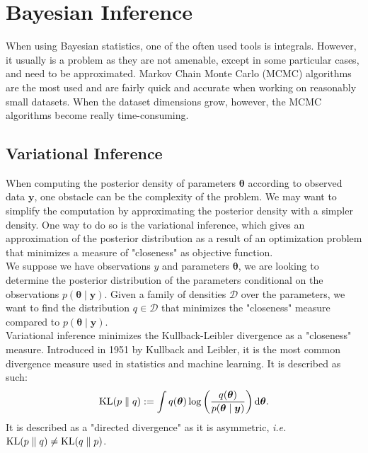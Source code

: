 \documentclass{article}
\DeclareMathOperator*{\KL}{{\rm KL}}
\begin{document}
\section{Bayesian Inference}
When using Bayesian statistics, one of the often used tools is integrals. However, it usually is a problem as they are not amenable, except in some particular cases, and need to be approximated. Markov Chain Monte Carlo (MCMC) algorithms are the most used and are fairly quick and accurate when working on reasonably small datasets. When the dataset dimensions grow, however, the MCMC algorithms become really time-consuming.
\subsection{Variational Inference}
When computing the posterior density of parameters $\boldsymbol{\theta}$ according to observed data $\boldsymbol{y}$, one obstacle can be the complexity of the problem. We may want to simplify the computation by approximating the posterior density with a simpler density. One way to do so is the variational inference, which gives an approximation of the posterior distribution as a result of an optimization problem that minimizes a measure of "closeness" as objective function.\\
\newline
%
We suppose we have observations $y$ and parameters $\boldsymbol{\theta}$, we are looking to determine the posterior distribution of the parameters conditional on the observations $p(\boldsymbol{\theta} \mid \boldsymbol{y})$. Given a family of densities $\mathcal{D}$ over the parameters, we want to find the distribution $q \in \mathcal{D}$ that minimizes the "closeness" measure compared to $p(\boldsymbol{\theta} \mid \boldsymbol{y})$.\\
\newline
%
Variational inference minimizes the Kullback-Leibler divergence as a "closeness" measure. Introduced in 1951 by Kullback and Leibler\cite{kl51}, it is the most common divergence measure used in statistics and machine learning. It is described as such:
\begin{equation*}
\KL(p\parallel q) := \int q(\boldsymbol{\theta})\log \left(\frac{q(\boldsymbol{\theta})}{p(\boldsymbol{\theta} \mid \boldsymbol{y})}\right) \mathrm{d}\boldsymbol{\theta}.
\end{equation*} 
It is described as a "directed divergence" as it is asymmetric, \textit{i.e.} $\KL(p\parallel q) \neq \KL(q \parallel p)$.\\
\end{document}
